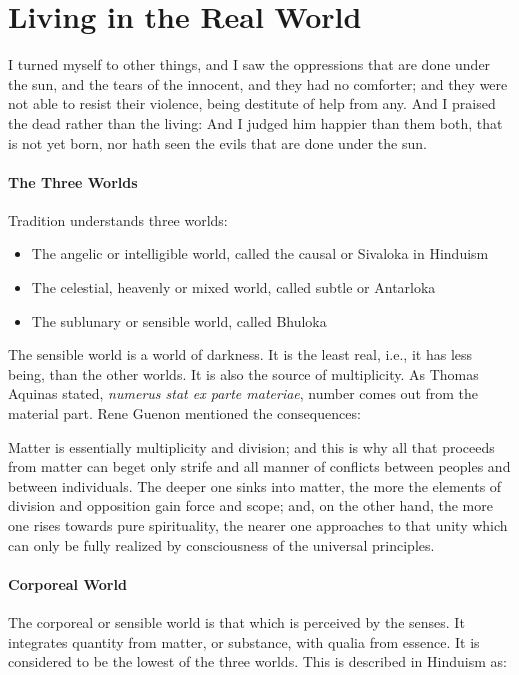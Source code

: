 \section{Living in the Real World}

\begin{quotex}
I turned myself to other things, and I saw the oppressions that are done under the sun, and the tears of the innocent, and they had no comforter; and they were not able to resist their violence, being destitute of help from any. And I praised the dead rather than the living: And I judged him happier than them both, that is not yet born, nor hath seen the evils that are done under the sun. 

\end{quotex}
\paragraph{The Three Worlds}
Tradition understands three worlds:

\begin{itemize}
\item The angelic or intelligible world, called the causal or Sivaloka in Hinduism 
\item The celestial, heavenly or mixed world, called subtle or Antarloka 
\item The sublunary or sensible world, called Bhuloka 
\end{itemize}
The sensible world is a world of darkness. It is the least real, i.e., it has less being, than the other worlds. It is also the source of multiplicity. As Thomas Aquinas stated, \emph{numerus stat ex parte materiae}, number comes out from the material part. Rene Guenon mentioned the consequences:

\begin{quotex}
Matter is essentially multiplicity and division; and this is why all that proceeds from matter can beget only strife and all manner of conflicts between peoples and between individuals. The deeper one sinks into matter, the more the elements of division and opposition gain force and scope; and, on the other hand, the more one rises towards pure spirituality, the nearer one approaches to that unity which can only be fully realized by consciousness of the universal principles. 

\end{quotex}
\paragraph{Corporeal World}
The corporeal or sensible world is that which is perceived by the senses. It integrates quantity from matter, or substance, with qualia from essence. It is considered to be the lowest of the three worlds. This is described in Hinduism as:

